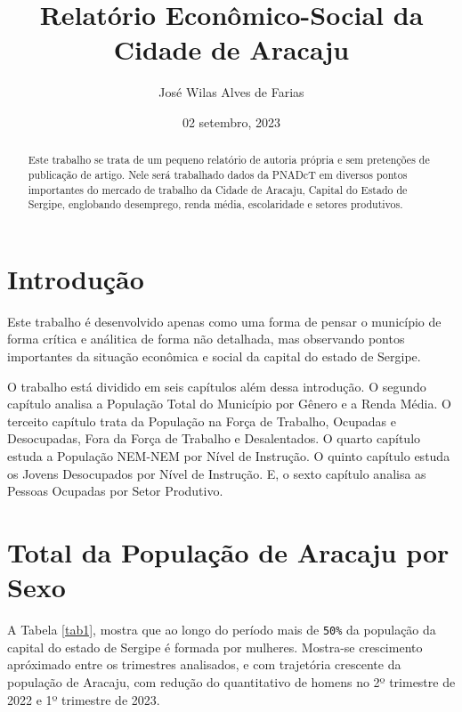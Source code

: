 \documentclass[
  12pt,
  a4paper,
]{article}
\title{Relatório Econômico-Social da Cidade de Aracaju}
\author{José Wilas Alves de Farias}
\date{02 setembro, 2023}
\begin{document}
\maketitle
\begin{abstract}
Este trabalho se trata de um pequeno relatório de autoria própria e sem
pretenções de publicação de artigo. Nele será trabalhado dados da PNADcT
em diversos pontos importantes do mercado de trabalho da Cidade de
Aracaju, Capital do Estado de Sergipe, englobando desemprego, renda
média, escolaridade e setores produtivos.
\end{abstract}

\hypertarget{introduuxe7uxe3o}{%
\section{Introdução}\label{introduuxe7uxe3o}}

Este trabalho é desenvolvido apenas como uma forma de pensar o município
de forma crítica e análitica de forma não detalhada, mas observando
pontos importantes da situação econômica e social da capital do estado
de Sergipe.

O trabalho está dividido em seis capítulos além dessa introdução. O
segundo capítulo analisa a População Total do Município por Gênero e a
Renda Média. O terceito capítulo trata da População na Força de
Trabalho, Ocupadas e Desocupadas, Fora da Força de Trabalho e
Desalentados. O quarto capítulo estuda a População NEM-NEM por Nível de
Instrução. O quinto capítulo estuda os Jovens Desocupados por Nível de
Instrução. E, o sexto capítulo analisa as Pessoas Ocupadas por Setor
Produtivo.

\hypertarget{total-da-populauxe7uxe3o-de-aracaju-por-sexo}{%
\section{Total da População de Aracaju por
Sexo}\label{total-da-populauxe7uxe3o-de-aracaju-por-sexo}}

A Tabela \ref{tab1}, mostra que ao longo do período mais de
\texttt{50\%} da população da capital do estado de Sergipe é formada por
mulheres. Mostra-se crescimento apróximado entre os trimestres
analisados, e com trajetória crescente da população de Aracaju, com
redução do quantitativo de homens no 2º trimestre de 2022 e 1º trimestre
de 2023.

\begingroup\fontsize{9}{11}\selectfont
\end{document}
